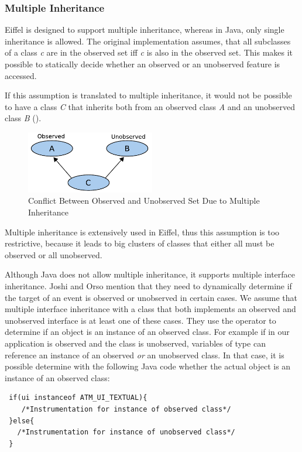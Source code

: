 \subsubsection{Multiple Inheritance}
Eiffel is designed to support multiple inheritance, whereas in Java, only single inheritance is allowed. The original implementation assumes, that all subclasses of a class \emph{c} are in the observed set iff \emph{c} is also in the observed set. This makes it possible to statically decide whether an observed or an unobserved feature is accessed.

If this assumption is translated to multiple inheritance, it would not be possible to have a class \emph{C} that inherits both from an observed class \emph{A} and an unobserved class \emph{B} ().
\begin{figure}[ht]
  \centering
  \includegraphics[width=0.5\textwidth]{illustrations/obs_unobs_multiple_inheritance}
  \caption{Conflict Between Observed and Unobserved Set Due to Multiple Inheritance}
  \label{fig:obs_unobs_multiple_inheritance}
\end{figure}

Multiple inheritance is extensively used in Eiffel, thus this assumption is too restrictive, because it leads to big clusters of classes that either all must be observed or all unobserved.

Although Java does not allow multiple inheritance, it supports multiple interface inheritance. Joshi and Orso \cite{orso05may} mention that they need to dynamically determine if the target of an event is observed or unobserved in certain cases. We assume that multiple interface inheritance with a class that both implements an observed and unobserved interface  is at least one of these cases. They use the  operator to determine if an object is an instance of an observed class. For example if in our application  is observed and the class  is unobserved, variables of type  can reference an instance of an observed \emph{or} an unobserved class. In that case, it is possible determine with the following Java code whether the actual object is an instance of an observed class:
\javalisting
\begin{lstlisting}
 if(ui instanceof ATM_UI_TEXTUAL){
    /*Instrumentation for instance of observed class*/
 }else{
   /*Instrumentation for instance of unobserved class*/
 }
\end{lstlisting}
\eiffellisting

